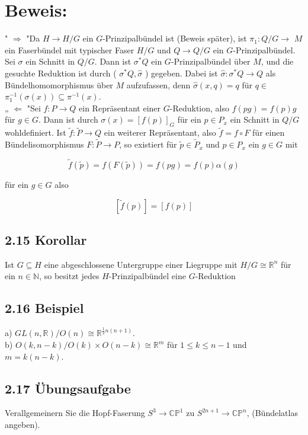 \documentclass[10pt, letterpaper]{article}
\begin{document}
\section*{Beweis:}
" $\Rightarrow$ "Da $H \rightarrow H / G$ ein $G$-Prinzipalbündel ist (Beweis später), ist $\pi_{1}: Q / G \rightarrow$ $M$ ein Faserbündel mit typischer Faser $H / G$ und $Q \rightarrow Q / G$ ein $G$-Prinzipalbündel. Sei $\sigma$ ein Schnitt in $Q / G$. Dann ist $\sigma^{*} Q$ ein $G$-Prinzipalbündel über $M$, und die gesuchte Reduktion ist durch ( $\sigma^{*} Q, \hat{\sigma}$ ) gegeben. Dabei ist $\hat{\sigma}: \sigma^{*} Q \rightarrow Q$ als Bündelhomomorphismus über $M$ aufzufassen, denn $\hat{\sigma}(x, q)=q$ für $q \in$ $\pi_{1}^{-1}(\sigma(x)) \subseteq \pi^{-1}(x)$.\\
„ $\Leftarrow$ "Sei $f: P \rightarrow Q$ ein Repräsentant einer $G$-Reduktion, also $f(p g)=f(p) g$ für $g \in G$. Dann ist durch $\sigma(x)=[f(p)]_{G}$ für ein $p \in P_{x}$ ein Schnitt in $Q / G$ wohldefiniert. Ist $\tilde{f}: \tilde{P} \rightarrow Q$ ein weiterer Repräsentant, also $\tilde{f}=f \circ F$ für einen Bündelisomorphismus $F: \tilde{P} \rightarrow P$, so existiert für $\tilde{p} \in \tilde{P}_{x}$ und $p \in P_{x}$ ein $g \in G$ mit

$$
\tilde{f}(\tilde{p})=f(F(\tilde{p}))=f(p g)=f(p) \alpha(g)
$$

für ein $g \in G$ also

$$
[\tilde{f}(p)]=[f(p)]
$$

\subsection*{2.15 Korollar}
Ist $G \subseteq H$ eine abgeschlossene Untergruppe einer Liegruppe mit $H / G \cong \mathbb{R}^{n}$ für ein $n \in \mathbb{N}$, so besitzt jedes $H$-Prinzipalbündel eine $G$-Reduktion

\subsection*{2.16 Beispiel}
a) $G L(n, \mathbb{R}) / O(n) \cong \mathbb{R}^{\frac{1}{2} n(n+1)}$.\\
b) $O(k, n-k) / O(k) \times O(n-k) \cong \mathbb{R}^{m}$ für $1 \leq k \leq n-1$ und $m=k(n-k)$.

\subsection*{2.17 Übungsaufgabe}
Verallgemeinern Sie die Hopf-Faserung $S^{3} \rightarrow \mathbb{C P}^{1}$ zu $S^{2 n+1} \rightarrow \mathbb{C} \mathbb{P}^{n}$, (Bündelatlas angeben).
\end{document}

